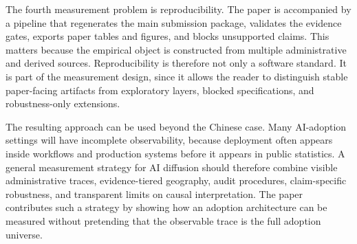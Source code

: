 The fourth measurement problem is reproducibility. The paper is accompanied by a pipeline that regenerates the main submission package, validates the evidence gates, exports paper tables and figures, and blocks unsupported claims. This matters because the empirical object is constructed from multiple administrative and derived sources. Reproducibility is therefore not only a software standard. It is part of the measurement design, since it allows the reader to distinguish stable paper-facing artifacts from exploratory layers, blocked specifications, and robustness-only extensions.

The resulting approach can be used beyond the Chinese case. Many AI-adoption settings will have incomplete observability, because deployment often appears inside workflows and production systems before it appears in public statistics. A general measurement strategy for AI diffusion should therefore combine visible administrative traces, evidence-tiered geography, audit procedures, claim-specific robustness, and transparent limits on causal interpretation. The paper contributes such a strategy by showing how an adoption architecture can be measured without pretending that the observable trace is the full adoption universe.